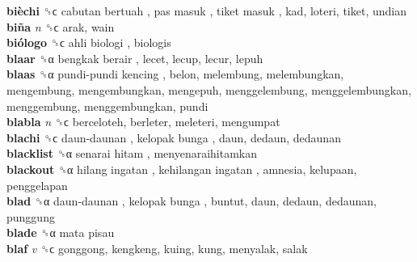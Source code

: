 \textbf{bièchi} ␝ϲ   cabutan bertuah ,  pas masuk ,  tiket masuk , kad, loteri, tiket, undian  \\
\textbf{biña} \emph{n}  ␝ϲ  arak, wain  \\
\textbf{biólogo} ␝ϲ   ahli biologi , biologis  \\
\textbf{blaar} ␝α   bengkak berair , lecet, lecup, lecur, lepuh  \\
\textbf{blaas} ␝α   pundi-pundi kencing , belon, melembung, melembungkan, mengembung, mengembungkan, mengepuh, menggelembung, menggelembungkan, menggembung, menggembungkan, pundi  \\
\textbf{blabla} \emph{n}  ␝ϲ  berceloteh, berleter, meleteri, mengumpat  \\
\textbf{blachi} ␝ϲ   daun-daunan ,  kelopak bunga , daun, dedaun, dedaunan  \\
\textbf{blacklist} ␝α   senarai hitam , menyenaraihitamkan  \\
\textbf{blackout} ␝α   hilang ingatan ,  kehilangan ingatan , amnesia, kelupaan, penggelapan  \\
\textbf{blad} ␝α   daun-daunan ,  kelopak bunga , buntut, daun, dedaun, dedaunan, punggung  \\
\textbf{blade} ␝α   mata pisau   \\
\textbf{blaf} \emph{v}  ␝ϲ  gonggong, kengkeng, kuing, kung, menyalak, salak  \\
